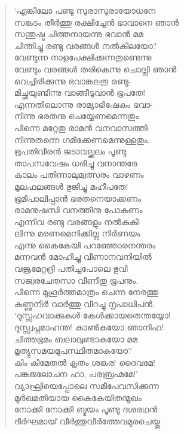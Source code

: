 \begin{verse}
‘എങ്കിലോ പണ്ടു സുരാസുരായോധനേ\\
സങ്കടം തീര്‍ത്തു രക്ഷിച്ചേന്‍ ഭാവാനെ ഞാന്‍\\
സന്തുഷ്ട ചിത്തനായന്നു ഭവാന്‍ മമ\\
ചിന്തിച്ചു രണ്ടു വരങ്ങള്‍ നല്‍കീലയോ?\\
വേണ്ടുന്ന നാളപേക്ഷിക്കുന്നതുണ്ടെന്നു\\
വേണ്ടും വരങ്ങള്‍ തരികെന്നു ചൊല്ലി ഞാന്‍\\
വെച്ചിരിക്കുന്നു ഭവാങ്കലതു രണ്ടു-\\
മിച്ഛയുണ്ടിന്നു വാങ്ങീടുവാന്‍ ഭൂപതേ!\\
എന്നതിലൊന്നു രാമ്യാഭിഷേകം ഭവാ-\\
നിന്നു ഭരതനു ചെയ്യേണമെന്നതും\\
പിന്നെ മറ്റേതു രാമന്‍ വനവാസത്തി-\\
നിന്നുതന്നെ ഗമിക്കേണമെന്നുള്ളതും.\\
ഭൂപതിവീരന്‍ ജടാവല്ക്കലം പൂണ്ടു\\
താപസവേഷം ധരിച്ചു വനാന്തരേ\\
കാലം പതിന്നാലുമ്വത്സരം വാഴണം\\
മൂലഫലങ്ങള്‍ ഭുജിച്ചു മഹീപതേ!\\
ഭൂമിപാലിപ്പാന്‍ ഭരതനെയാക്കണം\\
രാമനുഷസി വനത്തിനു പോകണം\\
എന്നിവ രണ്ടു വരങ്ങളും നല്‍കുകി-\\
ലിന്നു മരണമെനിക്കില്ല നിര്‍ണയം\\
എന്നു കൈകേയി പറഞ്ഞോരനന്തരം\\
മന്നവന്‍ മോഹിച്ചു വീണാനവനിയില്‍\\
വജ്രമേറ്റദ്രി പതിച്ചപോലെ ഭുവി\\
സജ്വരചേതസാ വീണീതു ഭൂപനും.\\
പിന്നെ മുഹൂര്‍ത്തമാത്രം ചെന്ന നേരത്തു\\
കണ്ണുനീര്‍ വാര്‍ത്തു വിറച്ചു നൃപാധിപന്‍.\\
‘ദുസ്സഹവാക്കുകള്‍ കേള്‍ക്കായതെന്തയ്യോ!\\
ദുസ്സ്വപ്നമാഹന്ത! കാണ്‍കയോ ഞാനിഹ!\\
ചിത്തഭ്രമം ബലാലുണ്ടാകയോ മമ\\
മൃത്യുസമയമുപസ്ഥിതമാകയോ?\\
കിം കിമേതല്‍ കൃതം ശങ്കര! ദൈവമേ!\\
പങ്കജലോചന ഹാ, പരബ്രഹ്മമേ!’\\
വ്യാഘ്രിയെപ്പോലെ സമീപേവസിക്കുന്ന\\
മൂര്‍ഖമതിയായ കൈകേയിതന്മൂഖം\\
നോക്കി നോക്കി ബ്ഭയം പൂണ്ടു ദശരഥന്‍\\
ദീര്‍ഘമായ് വീര്‍ത്തുവീര്‍ത്തേവമുരചെയ്തു.\\

\end{verse}
